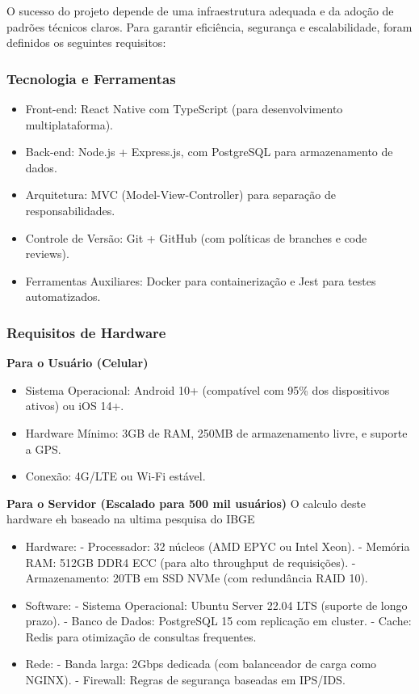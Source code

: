 \documentclass[a4paper, 12pt]{article}
\begin{document}
O sucesso do projeto depende de uma infraestrutura adequada e da adoção de padrões técnicos claros. Para garantir eficiência, segurança e escalabilidade, foram definidos os seguintes requisitos:

\subsubsection{Tecnologia e Ferramentas}
\begin{itemize}[]
\item Front-end: React Native com TypeScript (para desenvolvimento multiplataforma).
\item Back-end: Node.js + Express.js, com PostgreSQL para armazenamento de dados.
\item Arquitetura: MVC (Model-View-Controller) para separação de responsabilidades.
\item Controle de Versão: Git + GitHub (com políticas de branches e code reviews).
\item Ferramentas Auxiliares: Docker para containerização e Jest para testes automatizados.
\end{itemize}

\subsubsection{Requisitos de Hardware}

\textbf{Para o Usuário (Celular)}
\begin{itemize}[]
\item Sistema Operacional: Android 10+ (compatível com 95\% dos dispositivos ativos) ou iOS 14+.
\item Hardware Mínimo: 3GB de RAM, 250MB de armazenamento livre, e suporte a GPS.
\item Conexão: 4G/LTE ou Wi-Fi estável.
\end{itemize}

\textbf{Para o Servidor (Escalado para 500 mil usuários)}
O calculo deste hardware eh baseado na ultima pesquisa do IBGE \cite{ibge-2022}
\begin{itemize}[]
\item Hardware:
- Processador: 32 núcleos (AMD EPYC ou Intel Xeon).
- Memória RAM: 512GB DDR4 ECC (para alto throughput de requisições).
- Armazenamento: 20TB em SSD NVMe (com redundância RAID 10).
\item Software:
- Sistema Operacional: Ubuntu Server 22.04 LTS (suporte de longo prazo).
- Banco de Dados: PostgreSQL 15 com replicação em cluster.
- Cache: Redis para otimização de consultas frequentes.
\item Rede:
- Banda larga: 2Gbps dedicada (com balanceador de carga como NGINX).
- Firewall: Regras de segurança baseadas em IPS/IDS.
\end{itemize}
\end{document}
